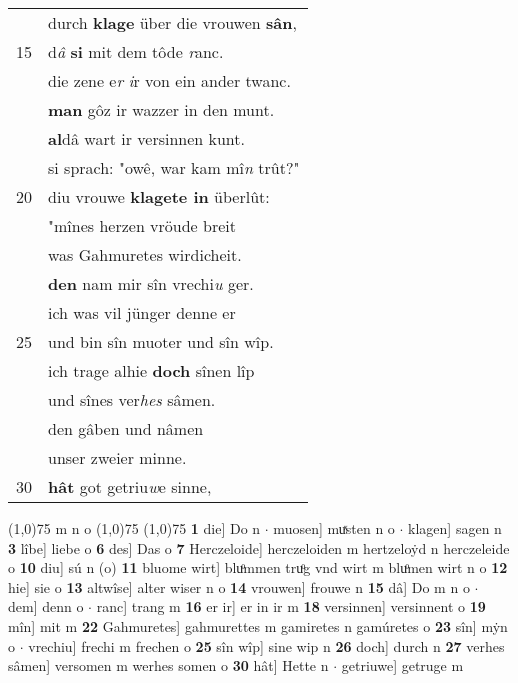 \documentclass[8pt,a4paper,notitlepage]{article}
\begin{document}
\begin{table}[ht]
\begin{minipage}[t]{0.5\linewidth}
\begin{tabular}{rl}
 & durch \textbf{klage} über die vrouwen \textbf{sân},\\ 
15 & d\textit{â} \textbf{si} mit dem tôde \textit{r}anc.\\ 
 & die zene e\textit{r} \textit{i}r von ein ander twanc.\\ 
 & \textbf{man} gôz ir wazzer in den munt.\\ 
 & \textbf{al}dâ wart ir versinnen kunt.\\ 
 & si sprach: "owê, war kam mî\textit{n} trût?"\\ 
20 & diu vrouwe \textbf{klagete in} überlût:\\ 
 & "mînes herzen vröude breit\\ 
 & was Gahmuretes wirdicheit.\\ 
 & \textbf{den} nam mir sîn vrechi\textit{u} ger.\\ 
 & ich was vil jünger denne er\\ 
25 & und bin sîn muoter und sîn wîp.\\ 
 & ich trage alhie \textbf{doch} sînen lîp\\ 
 & und sînes ver\textit{hes} sâmen.\\ 
 & den gâben und nâmen\\ 
 & unser zweier minne.\\ 
30 & \textbf{hât} got getriu\textit{w}e sinne,\\ 
\end{tabular}
\scriptsize
\line(1,0){75} \newline
m n o \newline
\line(1,0){75} \newline
\newline
\line(1,0){75} \newline
\textbf{1} die] Do n  $\cdot$ muosen] muͯsten n o  $\cdot$ klagen] sagen n \textbf{3} lîbe] liebe o \textbf{6} des] Das o \textbf{7} Herczeloide] herczeloiden m hertzeloẏd n herczeleide o \textbf{10} diu] sú n (o) \textbf{11} bluome wirt] bluͦmmen truͦg vnd wirt m bluͦmen wirt n o \textbf{12} hie] sie o \textbf{13} altwîse] alter wiser n o \textbf{14} vrouwen] frouwe n \textbf{15} dâ] Do m n o  $\cdot$ dem] denn o  $\cdot$ ranc] trang m \textbf{16} er ir] er in ir m \textbf{18} versinnen] versinnent o \textbf{19} mîn] mit m \textbf{22} Gahmuretes] gahmurettes m gamiretes n gamúretes o \textbf{23} sîn] mẏn o  $\cdot$ vrechiu] frechi m frechen o \textbf{25} sîn wîp] sine wip n \textbf{26} doch] durch n \textbf{27} verhes sâmen] versomen m werhes somen o \textbf{30} hât] Hette n  $\cdot$ getriuwe] getruge m \newline
\end{minipage}
\end{table}
\end{document}
